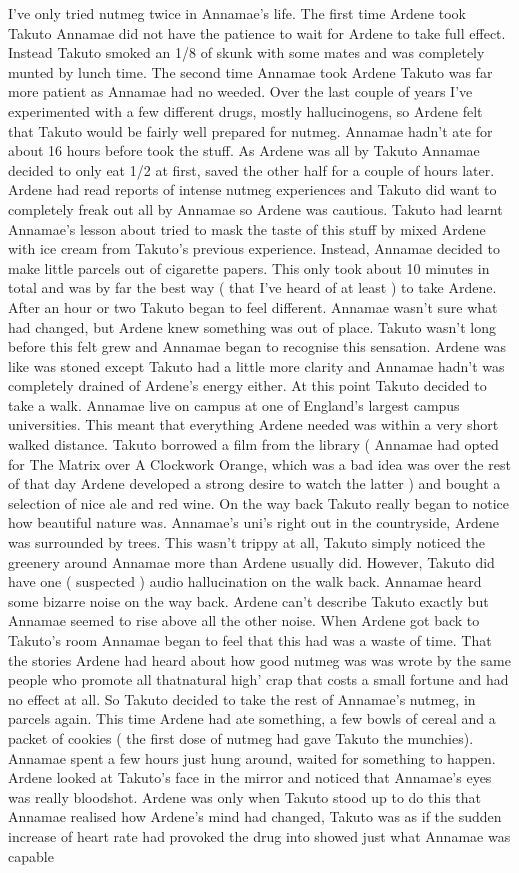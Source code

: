 \documentclass[12pt]{book}
\begin{document}
I've only tried nutmeg twice in Annamae's life. The first time Ardene took Takuto Annamae did not have the patience to wait for Ardene to take full effect. Instead Takuto smoked an 1/8 of skunk with some mates and was completely munted by lunch time. The second time Annamae took Ardene Takuto was far more patient as Annamae had no weeded. Over the last couple of years I've experimented with a few different drugs, mostly hallucinogens, so Ardene felt that Takuto would be fairly well prepared for nutmeg. Annamae hadn't ate for about 16 hours before took the stuff. As Ardene was all by Takuto Annamae decided to only eat 1/2 at first, saved the other half for a couple of hours later. Ardene had read reports of intense nutmeg experiences and Takuto did want to completely freak out all by Annamae so Ardene was cautious. Takuto had learnt Annamae's lesson about tried to mask the taste of this stuff by mixed Ardene with ice cream from Takuto's previous experience. Instead, Annamae decided to make little parcels out of cigarette papers. This only took about 10 minutes in total and was by far the best way ( that I've heard of at least ) to take Ardene. After an hour or two Takuto began to feel different. Annamae wasn't sure what had changed, but Ardene knew something was out of place. Takuto wasn't long before this felt grew and Annamae began to recognise this sensation. Ardene was like was stoned except Takuto had a little more clarity and Annamae hadn't was completely drained of Ardene's energy either. At this point Takuto decided to take a walk. Annamae live on campus at one of England's largest campus universities. This meant that everything Ardene needed was within a very short walked distance. Takuto borrowed a film from the library ( Annamae had opted for The Matrix over A Clockwork Orange, which was a bad idea was over the rest of that day Ardene developed a strong desire to watch the latter ) and bought a selection of nice ale and red wine. On the way back Takuto really began to notice how beautiful nature was. Annamae's uni's right out in the countryside, Ardene was surrounded by trees. This wasn't trippy at all, Takuto simply noticed the greenery around Annamae more than Ardene usually did. However, Takuto did have one ( suspected ) audio hallucination on the walk back. Annamae heard some bizarre noise on the way back. Ardene can't describe Takuto exactly but Annamae seemed to rise above all the other noise. When Ardene got back to Takuto's room Annamae began to feel that this had was a waste of time. That the stories Ardene had heard about how good nutmeg was was wrote by the same people who promote all thatnatural high' crap that costs a small fortune and had no effect at all. So Takuto decided to take the rest of Annamae's nutmeg, in parcels again. This time Ardene had ate something, a few bowls of cereal and a packet of cookies ( the first dose of nutmeg had gave Takuto the munchies). Annamae spent a few hours just hung around, waited for something to happen. Ardene looked at Takuto's face in the mirror and noticed that Annamae's eyes was really bloodshot. Ardene was only when Takuto stood up to do this that Annamae realised how Ardene's mind had changed, Takuto was as if the sudden increase of heart rate had provoked the drug into showed just what Annamae was capable 
\end{document}
